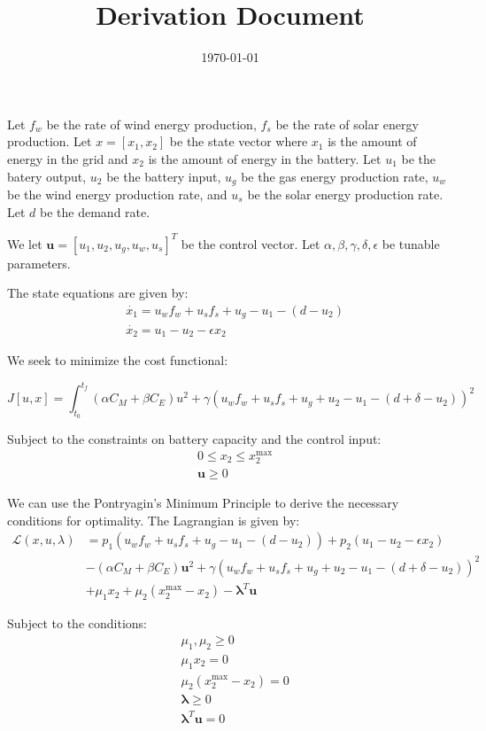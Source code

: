 \documentclass[12pt]{article}
\title{Derivation Document}
\author{}
\date{\today}
\begin{document}
\maketitle

Let $f_w$ be the rate of wind energy production, $f_s$ be the rate of solar energy production.
Let $x = [x_1, x_2]$ be the state vector where $x_1$ is the amount of energy in the grid and
 $x_2$ is the amount of energy in the battery.
Let $u_1$ be the batery output, $u_2$ be the battery input, 
$u_g$ be the gas energy production rate, $u_w$ be the wind energy production rate, and 
$u_s$ be the solar energy production rate.
Let $d$ be the demand rate.

We let $\mathbf{u} = [u_1, u_2, u_g, u_w, u_s]^T$ be the control vector.
Let $\alpha, \beta, \gamma, \delta, \epsilon$ be tunable parameters.

The state equations are given by:
\begin{align*}
    &\dot{x_1} = u_w f_w + u_s f_s + u_g - u_1 - (d - u_2) \\
    &\dot{x_2} = u_1 - u_2 - \epsilon x_2
\end{align*}

We seek to minimize the cost functional:

\begin{equation*}
    J[u, x] = \int_{t_0}^{t_f} (\alpha C_M + \beta C_E)u^2 + \gamma (u_w f_w + u_s f_s + u_g + u_2 - u_1 - (d + \delta - u_2))^2 
\end{equation*}

Subject to the constraints on battery capacity and the control input:
\begin{align*}
    &0 \leq x_2 \leq x_2^{\max} \\
    &\mathbf{u} \ge 0
\end{align*}

We can use the Pontryagin's Minimum Principle to derive the necessary conditions for optimality.
The Lagrangian is given by:
\begin{align*}
    \mathcal{L}(x, u, \lambda) &= p_1 (u_w f_w + u_s f_s + u_g - u_1 - (d - u_2)) + p_2 (u_1 - u_2 - \epsilon x_2) \\
    & - (\alpha C_M + \beta C_E)\mathbf{u}^2 + \gamma (u_w f_w + u_s f_s + u_g + u_2 - u_1 - (d + \delta - u_2))^2 \\
    & + \mu_1 x_2 + \mu_2 (x_2^{\max} - x_2) - \mathbf{\lambda}^T \mathbf{u}
\end{align*}

Subject to the conditions:
\begin{align*}
    &\mu_1, \mu_2 \geq 0 \\
    &\mu_1 x_2 = 0 \\
    &\mu_2 (x_2^{\max} - x_2) = 0 \\
    &\mathbf{\lambda} \geq 0 \\
    &\mathbf{\lambda}^T \mathbf{u} = 0 \\
\end{align*}
\end{document}
